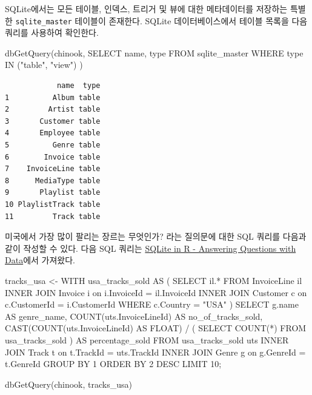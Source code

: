 \documentclass[
  letterpaper,
  chapter,a4paper,showtrims,openright,hidelinks]{oblivoir}
\newenvironment{Shaded}{\begin{snugshade}}{\end{snugshade}}
\newcommand{\FunctionTok}[1]{\textcolor[rgb]{0.28,0.35,0.67}{#1}}
\newcommand{\NormalTok}[1]{\textcolor[rgb]{0.00,0.23,0.31}{#1}}
\newcommand{\OtherTok}[1]{\textcolor[rgb]{0.00,0.23,0.31}{#1}}
\newcommand{\StringTok}[1]{\textcolor[rgb]{0.13,0.47,0.30}{#1}}
\begin{document}
SQLite에서는 모든 테이블, 인덱스, 트리거 및 뷰에 대한 메타데이터를
저장하는 특별한 \texttt{sqlite\_master} 테이블이 존재한다. SQLite
데이터베이스에서 테이블 목록을 다음 쿼리를 사용하여 확인한다.

\begin{Shaded}
\begin{Highlighting}[]
\FunctionTok{dbGetQuery}\NormalTok{(chinook, }\StringTok{\textquotesingle{}}
\StringTok{SELECT name, type }
\StringTok{         FROM sqlite\_master }
\StringTok{        WHERE type IN ("table", "view")}
\StringTok{\textquotesingle{}}\NormalTok{)}
\end{Highlighting}
\end{Shaded}

\begin{verbatim}
            name  type
1          Album table
2         Artist table
3       Customer table
4       Employee table
5          Genre table
6        Invoice table
7    InvoiceLine table
8      MediaType table
9       Playlist table
10 PlaylistTrack table
11         Track table
\end{verbatim}

미국에서 가장 많이 팔리는 장르는 무엇인가? 라는 질의문에 대한 SQL 쿼리를
다음과 같이 작성할 수 있다. 다음 SQL 쿼리는
\href{https://rpubs.com/qzeng1/case_questions_SQL_R}{SQLite in R -
Answering Questions with Data}에서 가져왔다.

\begin{Shaded}
\begin{Highlighting}[]
\NormalTok{tracks\_usa }\OtherTok{\textless{}{-}} \StringTok{\textquotesingle{}}
\StringTok{WITH usa\_tracks\_sold AS}
\StringTok{   (}
\StringTok{    SELECT il.* }
\StringTok{      FROM InvoiceLine  il}
\StringTok{     INNER JOIN Invoice i on i.InvoiceId = il.InvoiceId}
\StringTok{     INNER JOIN Customer c on c.CustomerId = i.CustomerId}
\StringTok{     WHERE c.Country = "USA"}
\StringTok{   )}
\StringTok{SELECT g.name AS genre\_name,}
\StringTok{       COUNT(uts.InvoiceLineId) AS no\_of\_tracks\_sold,}
\StringTok{       CAST(COUNT(uts.InvoiceLineId) AS FLOAT) / (}
\StringTok{                                                    SELECT COUNT(*) }
\StringTok{                                                      FROM usa\_tracks\_sold}
\StringTok{                                                    ) AS percentage\_sold}
\StringTok{  FROM usa\_tracks\_sold uts}
\StringTok{ INNER JOIN Track  t on t.TrackId = uts.TrackId}
\StringTok{ INNER JOIN Genre  g on g.GenreId = t.GenreId}
\StringTok{ GROUP BY 1}
\StringTok{ ORDER BY 2 DESC}
\StringTok{ LIMIT 10;}
\StringTok{\textquotesingle{}}

\FunctionTok{dbGetQuery}\NormalTok{(chinook, tracks\_usa)}
\end{Highlighting}
\end{Shaded}
\end{document}
